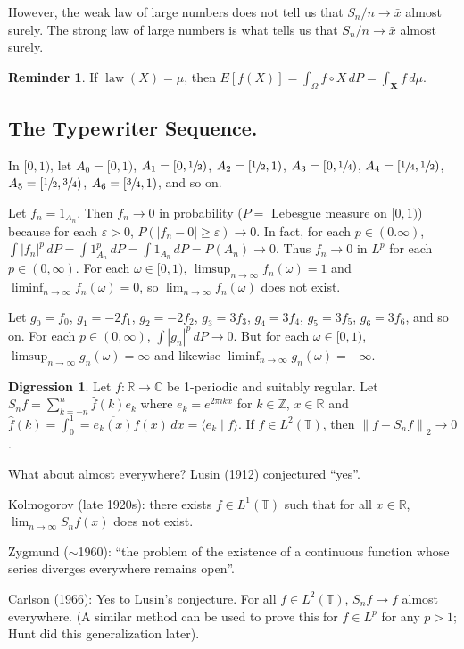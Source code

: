 \documentclass{article}
\DeclareMathOperator{\law}{law}
\newcommand{\C}{\mathbb{C}}
\newcommand{\R}{\mathbb{R}}
\newcommand{\Z}{\mathbb{Z}}
\newcommand{\conj}[1]{\overline{#1}}
\newcommand{\norm}[1]{\left\lVert#1\right\rVert} %
\theoremstyle{definition}
\newtheorem*{reminder}{Reminder}
\newtheorem*{digression}{Digression}
\begin{document}
However, the weak law of large numbers does not tell us that $S_n/n \to \bar{x}$ almost surely. The strong law of large numbers is what tells us that $S_n/n \to \bar{x}$ almost surely.

\begin{reminder}
If $\law(X) = \mu$, then $E[f(X)] = \int_\Omega f \circ X \,dP = \int_{\mathbf{X}} f\,d\mu$.
\end{reminder}

\subsection*{The Typewriter Sequence.} In $[0,1)$, let $A_0 = [0,1)$, $A_1 = [0, \sfrac{1}{2})$, $A_2 = [\sfrac{1}{2}, 1)$, $A_3 = [0, \sfrac{1}{4})$, $A_4 = [\sfrac{1}{4}, \sfrac{1}{2})$, $A_5 = [\sfrac{1}{2}, \sfrac{3}{4})$, $A_6 = [\sfrac{3}{4}, 1)$, and so on.

Let $f_n = 1_{A_n}$. Then $f_n \to 0$ in probability ($P=$ Lebesgue measure on $[0,1)$)
because for each $\varepsilon > 0$, $P(|f_n-0| \geq \varepsilon) \to 0$. In fact, for each $p \in (0. \infty)$, $\int |f_n|^p \,dP = \int 1_{A_n}^p \,dP = \int 1_{A_n} \,dP = P(A_n) \to 0$. Thus $f_n \to 0$ in $L^p$ for each $p \in (0, \infty)$. For each $\omega \in [0,1)$, $\limsup_{n\to\infty} f_n(\omega) = 1$ and $\liminf_{n\to\infty} f_n(\omega) = 0$, so $\lim_{n\to\infty} f_n(\omega)$ does not exist.

Let $g_0 = f_0$, $g_1 = -2f_1$, $g_2 = -2f_2$, $g_3 = 3f_3$, $g_4 = 3f_4$, $g_5 = 3f_5$, $g_6 = 3f_6$, and so on. For each $p \in (0, \infty)$, $\int |g_n|^p \,dP \to 0$. But for each $\omega \in [0,1)$, $\limsup_{n\to\infty} g_n(\omega) = \infty$ and likewise $\liminf_{n\to\infty} g_n(\omega) = -\infty$.

\begin{digression}
Let $f : \R \to \C$ be 1-periodic and suitably regular. Let $S_nf = \sum_{k=-n}^n \hat{f}(k)e_k$ where $e_k = e^{2\pi ikx}$ for $k \in \Z$, $x \in \R$ and $\hat{f}(k) = \int_0^1 = \conj{e_k(x)}f(x)\,dx = \langle e_k \mid f \rangle$. If $f \in L^2(\mathbb{T})$, then $\norm{f-S_nf}_2 \to 0$.
 
What about almost everywhere? Lusin (1912) conjectured ``yes''.

Kolmogorov (late 1920s): there exists $f \in L^1(\mathbb{T})$ such that for all $x \in \R$, $\lim_{n\to\infty} S_n f(x)$ does not exist.

Zygmund ($\sim$1960): ``the problem of the existence of a continuous function whose series diverges everywhere remains open''.

Carlson (1966): Yes to Lusin's conjecture. For all $f \in L^2(\mathbb{T})$, $S_nf \to f$ almost everywhere. (A similar method can be used to prove this for $f \in L^p$ for any $p > 1$; Hunt did this generalization later).
\end{digression}
\end{document}
